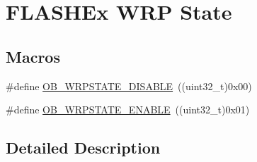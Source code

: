 \hypertarget{group___f_l_a_s_h_ex___w_r_p___state}{\section{F\-L\-A\-S\-H\-Ex W\-R\-P State}
\label{group___f_l_a_s_h_ex___w_r_p___state}
}
\subsection*{Macros}
\begin{DoxyCompactItemize}
\item 
\#define \hyperlink{group___f_l_a_s_h_ex___w_r_p___state_gaa34eb6205fe554f65a311ee974d5a4ab}{O\-B\-\_\-\-W\-R\-P\-S\-T\-A\-T\-E\-\_\-\-D\-I\-S\-A\-B\-L\-E}~((uint32\-\_\-t)0x00)
\item 
\#define \hyperlink{group___f_l_a_s_h_ex___w_r_p___state_ga9fc463145ab57616baa36d95523186a1}{O\-B\-\_\-\-W\-R\-P\-S\-T\-A\-T\-E\-\_\-\-E\-N\-A\-B\-L\-E}~((uint32\-\_\-t)0x01)
\end{DoxyCompactItemize}


\subsection{Detailed Description}



